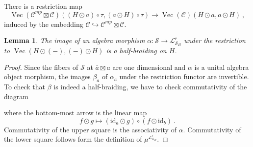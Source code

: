 \documentclass[a4paper,11pt,reqno]{amsart}
\numberwithin{equation}{section}
\newtheorem{lemma}[theorem]{Lemma}
\theoremstyle{remark}
\theoremstyle{definition}
\newcommand{\cC}{\mathcal C}
\newcommand{\cL}{\mathcal L}
\newcommand{\cS}{\mathcal S}
\DeclareMathOperator{\Vect}{Vec}
\newcommand{\id}{\mathrm{id}}
\begin{document}
There is a restriction map
\[ 
\Vect(\cC^{mp} \boxtimes \cC)((H \odot a) \circ \tau, (a \odot H) \circ \tau ) \to \Vect(\cC) (H \odot a, a \odot H ) \ ,
\]
induced by the embedding $\cC \hookrightarrow \cC^{mp} \boxtimes \cC$. 
\begin{lemma}
	The image of an algebra morphism $\alpha: \cS \to \cL^r_{\cS_H}$ under the restriction to $\Vect(H \odot (-), (-) \odot H)$ is a half-braiding on $H$. 
\end{lemma}
\begin{proof}
	Since the fibers of $\cS$ at $\bar{a} \boxtimes a$ are one dimensional and $\alpha$ is a unital algebra object morphism, the images $\beta_a$ of $\alpha_a$ under the restriction functor are invertible.  To check that $\beta$ is indeed a half-braiding, we have to check commutativity of the diagram
	\begin{center}
	\end{center}
	where the bottom-most arrow is the linear map
	\[
	f \odot g \mapsto (\id_a \odot g) \circ (f \odot \id_b) \ .
	\]
	Commutativity of the upper square is the associativity of $\alpha$. Commutativity of the lower square follows form the definition of $\mu^{\cL^r_{\cS_H}}$.
\end{proof}
\end{document}
